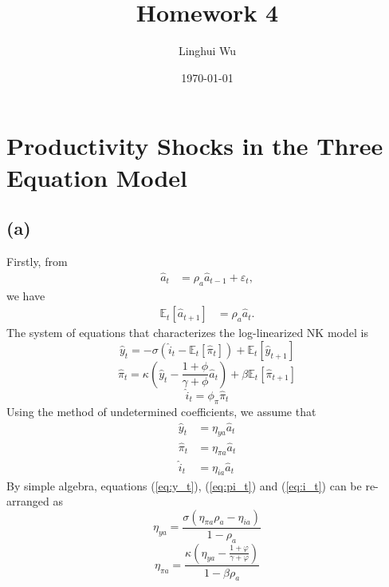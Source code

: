\documentclass[12pt]{article}
\title{
Homework 4
}
\author{Linghui Wu}
\date{\today}
\newcommand{\E}{\mathbb{E}}
\begin{document}
\maketitle

\section{Productivity Shocks in the Three Equation Model}

\subsection*{(a)}

Firstly, from 
\begin{align*}
\hat{a}_{t} &= \rho_{a} \hat{a}_{t-1} + \varepsilon_{t},
\end{align*}
we have 
\begin{align*}
\E_{t}\left[\hat{a}_{t+1}\right] &= \rho_{a}\hat{a}_{t}.
\end{align*}
The system of equations that characterizes the log-linearized NK model is
\begin{equation}
\label{eq:y_t}
\hat{y}_{t} = -\sigma\left(\hat{i}_{t}-\E_{t}\left[\hat{\pi}_{t}\right]\right) + \E_{t}\left[\hat{y}_{t+1}\right]
\end{equation}
\begin{equation}
\label{eq:pi_t}
\hat{\pi}_{t} = \kappa \left(\hat{y}_{t}-\frac{1+\phi}{\gamma+\phi}\hat{a}_{t}\right) + \beta\E_{t}\left[\hat{\pi}_{t+1}\right]
\end{equation}
\begin{equation}
\label{eq:i_t}
\hat{i}_{t} = \phi_{\pi}\hat{\pi}_{t}
\end{equation}
Using the method of undetermined coefficients, we assume that 
\begin{align*}
\hat{y}_{t} &= \eta_{ya}\hat{a}_{t} \\
\hat{\pi}_{t} &= \eta_{\pi a}\hat{a}_{t} \\
\hat{i}_{t} &= \eta_{ia}\hat{a}_{t}
\end{align*}
By simple algebra, equations (\ref{eq:y_t}), (\ref{eq:pi_t}) and (\ref{eq:i_t}) can be re-arranged as 
\begin{equation}
\label{eq:eta_ya}
\eta_{ya} = \frac{\sigma \left(\eta_{\pi a}\rho_{a}-\eta_{ia}\right)}{1-\rho_{a}}
\end{equation}
\begin{equation}
\label{eq:eta_pia}
\eta_{\pi a} = \frac{\kappa\left(\eta_{ya} - \frac{1+\varphi}{\gamma+\varphi}\right)}{1-\beta\rho_{a}}
\end{equation}
\end{document}
